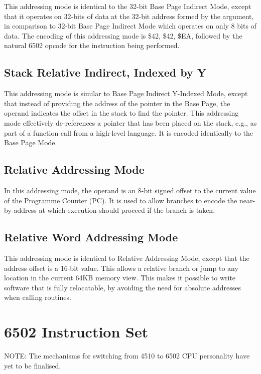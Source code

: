 This addressing mode is identical to the 32-bit Base Page Indirect Mode,
except that it operates on 32-bits of data at the 32-bit address formed by the argument,
in comparison to 32-bit Base Page Indirect Mode which operates on only 8 bits
of data.   The encoding of this addressing mode is \$42, \$42, \$EA, followed by the
natural 6502 opcode for the instruction being performed.

\subsection{Stack Relative Indirect, Indexed by Y}

This addressing mode is similar to Base Page Indirect Y-Indexed Mode,
except that instead of providing the address of the pointer in the
Base Page, the operand indicates the offset in the stack to find the
pointer. This addressing mode effectively de-references a pointer that
has been placed on the stack, e.g., as part of a function call from a
high-level language.  It is encoded identically to the Base Page Mode.

\subsection{Relative Addressing Mode}

In this addressing mode, the operand is an 8-bit signed offset to the
current value of the Programme Counter (PC). It is used to allow branches
to encode the near-by address at which execution should proceed if the
branch is taken.

\subsection{Relative Word Addressing Mode}

This addressing mode is identical to Relative Addressing Mode, except that
the address offset is a 16-bit value. This allows a relative branch or jump
to any location in the current 64KB memory view.  This makes it possible
to write software that is fully relocatable, by avoiding the need for absolute
addresses when calling routines.

\section{6502 Instruction Set}

NOTE: The mechanisms for switching from 4510 to 6502 CPU personality
have yet to be finalised.

